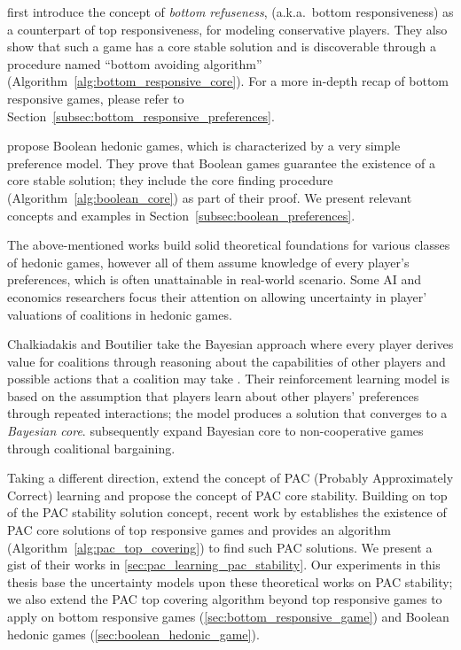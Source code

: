  first introduce the concept of \textit{bottom refuseness},
(a.k.a.\ bottom responsiveness) as a counterpart of top responsiveness, for
modeling conservative players.
They also show that such a game has a core stable solution and is discoverable
through a procedure named ``bottom avoiding algorithm''
(Algorithm~\ref{alg:bottom_responsive_core}).
For a more in-depth recap of bottom responsive games, please refer to
Section~\ref{subsec:bottom_responsive_preferences}.

 propose Boolean hedonic games,
which is characterized by a very simple preference model.
They prove that Boolean games guarantee the existence of a core stable solution;
they include the core finding procedure (Algorithm~\ref{alg:boolean_core}) as
part of their proof.
We present relevant concepts and examples in
Section~\ref{subsec:boolean_preferences}.

The above-mentioned works build solid theoretical foundations for various
classes of hedonic games, however all of them assume knowledge of every
player's preferences, which is often unattainable in real-world scenario.
Some AI and economics researchers focus their attention on allowing uncertainty in
player' valuations of coalitions in hedonic games.

Chalkiadakis and Boutilier take the Bayesian approach where every player derives
value for coalitions through reasoning about the capabilities of other players
and possible actions that a coalition may take
\cite{Chalkiadakis2004, Chalkiadakis:2008:SDM:1402383.1402435}.
Their reinforcement learning model is based on the assumption that players
learn about other players' preferences through repeated interactions; the model
produces a solution that converges to a \textit{Bayesian core}.
 subsequently expand Bayesian core to
non-cooperative games through coalitional bargaining.

Taking a different direction, 
extend the concept of PAC (Probably Approximately Correct) learning and
propose the concept of PAC core stability.
Building on top of the PAC stability solution concept, recent work by
 establishes the existence of PAC core solutions
of top responsive games and provides an algorithm 
(Algorithm~\ref{alg:pac_top_covering}) to find such PAC solutions.
We present a gist of their works in \autoref{sec:pac_learning_pac_stability}.
Our experiments in this thesis base the uncertainty models upon these theoretical
works on PAC stability; we also extend the PAC top covering algorithm beyond top responsive games to apply on bottom
responsive games (\autoref{sec:bottom_responsive_game}) and Boolean hedonic games
 (\autoref{sec:boolean_hedonic_game}).

